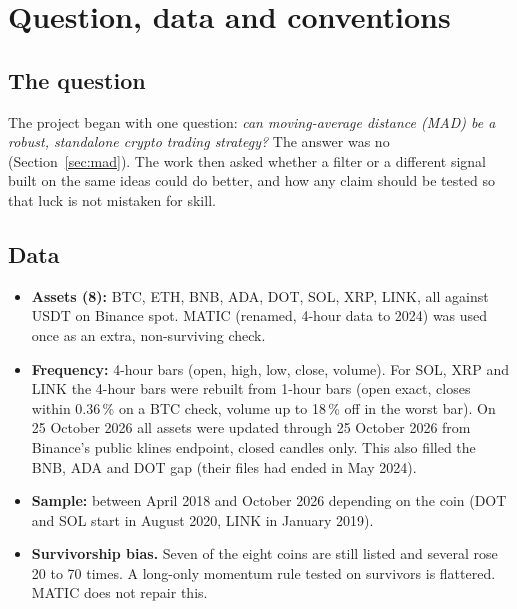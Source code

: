 \documentclass[11pt,a4paper]{article}
\begin{document}
\tableofcontents
\clearpage

\section{Question, data and conventions}
\subsection{The question}
The project began with one question: \emph{can moving-average distance (MAD) be a robust, standalone crypto trading strategy?} The answer
was no (Section~\ref{sec:mad}). The work then asked whether a filter or a different signal built on the same ideas could do better, and
how any claim should be tested so that luck is not mistaken for skill.

\subsection{Data}
\begin{itemize}
\item \textbf{Assets (8):} BTC, ETH, BNB, ADA, DOT, SOL, XRP, LINK, all against USDT on Binance spot. MATIC (renamed, 4-hour data to 2024) was used once as an
extra, non-surviving check.
\item \textbf{Frequency:} 4-hour bars (open, high, low, close, volume). For SOL, XRP and LINK the 4-hour bars were rebuilt from 1-hour bars (open
exact, closes within 0.36\,\% on a BTC check, volume up to 18\,\% off in the worst bar). On 25 October 2026 all assets were updated through
25 October 2026 from Binance's public klines endpoint, closed candles only. This also filled the BNB, ADA and DOT gap (their files had ended in May 2024).
\item \textbf{Sample:} between April 2018 and October 2026 depending on the coin (DOT and SOL start in August 2020, LINK in January 2019).
\item \textbf{Survivorship bias.} Seven of the eight coins are still listed and several rose 20 to 70 times. A long-only momentum rule
tested on survivors is flattered. MATIC does not repair this.
\end{itemize}
\end{document}
